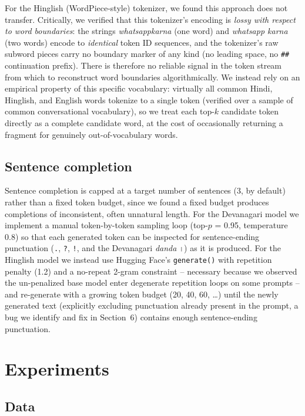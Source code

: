 \documentclass[11pt]{article}
\begin{document}
For the Hinglish (WordPiece-style) tokenizer, we found this approach does not transfer. Critically, we verified that this tokenizer's encoding is \emph{lossy with respect to word boundaries}: the strings \textit{whatsappkarna} (one word) and \textit{whatsapp karna} (two words) encode to \emph{identical} token ID sequences, and the tokenizer's raw subword pieces carry no boundary marker of any kind (no leading space, no \texttt{\#\#} continuation prefix). There is therefore no reliable signal in the token stream from which to reconstruct word boundaries algorithmically. We instead rely on an empirical property of this specific vocabulary: virtually all common Hindi, Hinglish, and English words tokenize to a single token (verified over a sample of common conversational vocabulary), so we treat each top-$k$ candidate token directly as a complete candidate word, at the cost of occasionally returning a fragment for genuinely out-of-vocabulary words.

\subsection{Sentence completion}

Sentence completion is capped at a target number of sentences (3, by default) rather than a fixed token budget, since we found a fixed budget produces completions of inconsistent, often unnatural length. For the Devanagari model we implement a manual token-by-token sampling loop (top-$p$ = 0.95, temperature 0.8) so that each generated token can be inspected for sentence-ending punctuation (\texttt{.}, \texttt{?}, \texttt{!}, and the Devanagari \emph{danda} \texttt{\texthindi{।}}) as it is produced. For the Hinglish model we instead use Hugging Face's \texttt{generate()} with repetition penalty (1.2) and a no-repeat 2-gram constraint -- necessary because we observed the un-penalized base model enter degenerate repetition loops on some prompts -- and re-generate with a growing token budget (20, 40, 60, \ldots) until the newly generated text (explicitly excluding punctuation already present in the prompt, a bug we identify and fix in Section~6) contains enough sentence-ending punctuation.

\section{Experiments}

\subsection{Data}
\end{document}
